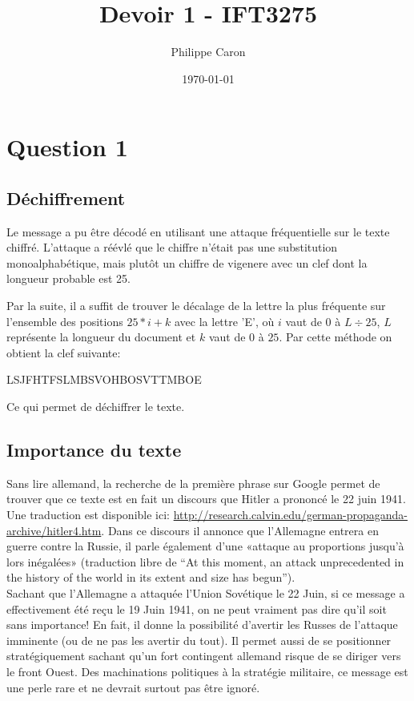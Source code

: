 \documentclass{article}
\title{Devoir 1 - IFT3275}
\date{\today}
\author{Philippe Caron}
\begin{document}
\maketitle
\section{Question 1}
\subsection{Déchiffrement}
Le message a pu être décodé en utilisant une attaque fréquentielle sur le texte chiffré. L'attaque a réévlé que le chiffre n'était pas une substitution monoalphabétique, mais plutôt un chiffre de vigenere avec un clef dont la longueur probable est 25.

Par la suite, il a suffit de trouver le décalage de la lettre la plus fréquente sur l'ensemble des positions $25 * i + k$ avec la lettre 'E', où $i$ vaut de $0$ à $L \div 25$, $L$ représente la longueur du document et $k$ vaut de $0$ à $25$. Par cette méthode on obtient la clef suivante:
\begin{center}
  LSJFHTFSLMBSVOHBOSVTTMBOE
\end{center}
Ce qui permet de déchiffrer le texte.
\subsection{Importance du texte}
Sans lire allemand, la recherche de la première phrase sur Google permet de trouver que ce texte est en fait un discours que Hitler a prononcé le 22 juin 1941. Une traduction est disponible ici: \url{http://research.calvin.edu/german-propaganda-archive/hitler4.htm}. Dans ce discours il annonce que l'Allemagne entrera en guerre contre la Russie, il parle également d'une «attaque au proportions jusqu'à lors inégalées» (traduction libre de ``At this moment, an attack unprecedented in the history of the world in its extent and size has begun''). \\
Sachant que l'Allemagne a attaquée l'Union Sovétique le 22 Juin, si ce message a effectivement été reçu le 19 Juin 1941, on ne peut vraiment pas dire qu'il soit sans importance! En fait, il donne la possibilité d'avertir les Russes de l'attaque imminente (ou de ne pas les avertir du tout). Il permet aussi de se positionner stratégiquement sachant qu'un fort contingent allemand risque de se diriger vers le front Ouest. Des machinations politiques à la stratégie militaire, ce message est une perle rare et ne devrait surtout pas être ignoré.
\end{document}
